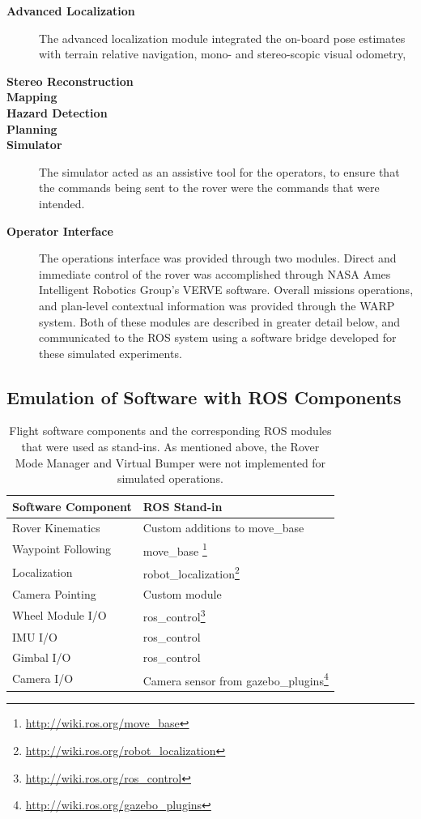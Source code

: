 \documentclass[twocolumn,letterpaper]{IEEEAerospaceCLS}  %
\begin{document}
\begin{description}
\item[\textbf{Advanced Localization}]  The advanced localization module integrated the on-board pose estimates with terrain relative navigation, mono- and stereo-scopic visual odometry, 
\item[\textbf{Stereo Reconstruction}]
\item[\textbf{Mapping}]
\item[\textbf{Hazard Detection}]
\item[\textbf{Planning}]
\item[\textbf{Simulator}]  The simulator acted as an assistive tool for the operators, to ensure that the commands being sent to the rover were the commands that were intended.  
\item[\textbf{Operator Interface}]  The operations interface was provided through two modules.  
Direct and immediate control of the rover was accomplished through NASA Ames Intelligent Robotics Group's VERVE software.  
Overall missions operations, and plan-level contextual information was provided through the WARP system.  
Both of these modules are described in greater detail below, and communicated to the ROS system using a software bridge developed for these simulated experiments.
\end{description}

\subsection{Emulation of Software with ROS Components}

\begin{table}[htp]
\caption{Flight software components and the corresponding ROS modules that were used as stand-ins.  
As mentioned above, the Rover Mode Manager and Virtual Bumper were not implemented for simulated operations.\label{tbl:flight-software-components}}
\begin{tabular}{l|l}
\textbf{Software Component} & \textbf{ROS Stand-in} \\
\hline
Rover Kinematics &  Custom additions to move\_base\\
Waypoint Following & move\_base \footnote{\url{http://wiki.ros.org/move_base}}\\
Localization & robot\_localization\footnote{\url{http://wiki.ros.org/robot_localization}}\\
Camera Pointing & Custom module \\
Wheel Module I/O & ros\_control\footnote{\url{http://wiki.ros.org/ros_control}}\\
IMU I/O & ros\_control\\
Gimbal I/O & ros\_control\\
Camera I/O & Camera sensor from gazebo\_plugins\footnote{\url{http://wiki.ros.org/gazebo_plugins}}\\
\hline
\end{tabular}
\end{table}
\end{document}
